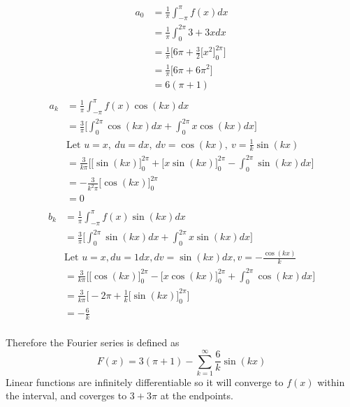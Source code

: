 \documentclass{article}
\begin{document}
\begin{enumerate}
\begin{enumerate}
\begin{multicols}{2}
\noindent
\begin{align*}
    a_0 &= \frac{1}{\pi} \int_{-\pi}^{\pi}f(x) dx \\
    &= \frac{1}{\pi} \int_{0}^{2\pi}3 + 3x dx \\
    &= \frac{1}{\pi} \Bigg[6\pi +  \frac{3}{2}\Big[x^2\Big]^{2\pi}_{0}\Bigg] \\
    &= \frac{1}{\pi} \Bigg[6\pi + 6\pi^2 \Bigg] \\
    &= 6(\pi + 1)\\
\end{align*}
\begin{align*}
    a_k &= \frac{1}{\pi} \int_{-\pi}^{\pi}f(x)\cos(kx) dx \\
    &= \frac{3}{\pi}\Bigg[ \int_{0}^{2\pi}\cos(kx) dx + \int_{0}^{2\pi}x\cos(kx) dx \Bigg] \\
    &\text{Let } u = x,\: du = dx,\: dv = \cos(kx),\: v = \frac{1}{k}\sin(kx) \\
    &= \frac{3}{k\pi}\Bigg[\Big[\sin(kx)\Big]_{0}^{2\pi} + \Big[x \sin(kx)\Big]^{2\pi}_{0} - \int_{0}^{2\pi} \sin(kx) dx\Bigg] \\
    &= -\frac{3}{k^2\pi}\Big[\cos(kx)\Big]_{0}^{2\pi} \\
    &= 0 \\
\end{align*}
\begin{align*}
    b_k &= \frac{1}{\pi} \int_{-\pi}^{\pi}f(x)\sin(kx) dx \\
    &= \frac{3}{\pi}\Bigg[ \int_{0}^{2\pi}\sin(kx) dx + \int_{0}^{2\pi}x\sin(kx) dx \Bigg] \\
    &\text{Let $u = x, du = 1 dx, dv = \sin(kx) dx, v = -\frac{\cos(kx)}{k}$} \\
    &= \frac{3}{k\pi}\Bigg[ \Big[\cos(kx)\Big]_{0}^{2\pi} - \Big[x\cos(kx)\Big]_{0}^{2\pi} + \int_{0}^{2\pi}\cos(kx) dx \Bigg] \\
    &= \frac{3}{k\pi}\Bigg[ -2\pi + \frac{1}{k} \Big[\sin(kx)\Big]_{0}^{2\pi}  \Bigg] \\
    &= -\frac{6}{k}\\ 
    \end{align*} 
    \end{multicols}
    Therefore the Fourier series is defined as 
    \[
        F(x) = 3(\pi + 1) - \sum_{k=1}^{\infty}\frac{6}{k}\sin(kx)
    \]
    Linear functions are infinitely differentiable so it will converge to $f(x)$ within the interval, and coverges to $3+3\pi$ at the endpoints.
\end{enumerate}


\end{enumerate}
\end{document}
